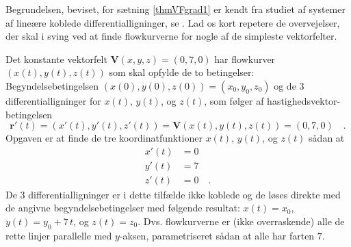 Begrundelsen, beviset, for sætning
\ref{thmVFgrad1} er kendt fra studiet af systemer af lineære
koblede differentialligninger, se . Lad os kort
repetere de overvejelser, der skal i sving ved at finde flowkurverne for nogle af de simpleste vektorfelter.

\begin{example}\label{exVFkonstantFlow}
Det konstante vektorfelt ${\mathbf{V}}(x,y,z) = (0,7,0)$ har flowkurver
$(x(t), y(t), z(t))$ som skal opfylde de to betingelser:
Begyndelsebetingelsen $(x(0), y(0), z(0)) = (x_{0}, y_{0}, z_{0})$
og de $3$ differentialligninger for $x(t)$, $y(t)$, og $z(t)$, som
følger af hastighedsvektor-betingelsen
\begin{equation}
{\mathbf{r}}'(t) = (x'(t),
y'(t), z'(t)) = {\mathbf{V}}(x(t), y(t), z(t)) = (0, 7, 0) \quad .
\end{equation}
Opgaven er at finde de tre koordinatfunktioner  $x(t)$, $y(t)$, og $z(t)$ sådan at
\begin{equation}
\begin{aligned}
x'(t) &= 0 \\
y'(t) &=  7 \\
z'(t) &= 0  \quad .
\end{aligned}
\end{equation}
De 3
differentialligninger er i dette tilfælde ikke koblede og de løses
direkte med de angivne begyndelsebetingelser med følgende resultat:
$x(t) = x_{0}$, $y(t) = y_{0} + 7\,t$, og $z(t) = z_{0}$. Dvs.
flowkurverne er (ikke overraskende) alle de rette linjer parallelle
med $y$-aksen, parametriseret sådan at alle har farten $7$.
\end{example}


